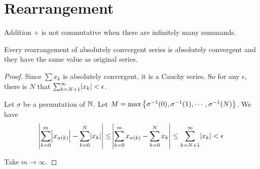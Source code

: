 
\section{Rearrangement}

Addition $+$ is not commutative when there are infinitely many summands.

\begin{theorem}
    Every rearrangement of absolutely convergent series is absolutely convergent and they have the same value as original series.    
\end{theorem}
\begin{proof}
    Since $\sum x_k$ is absolutely convergent, it is a Cauchy series. So for any $\epsilon$, there is $N$ that $\sum_{k=N+1}^\infty \abs{x_k} < \epsilon$.
    
    Let $\sigma$ be a permutation of $\mathbb{N}$. Let $M = \max \set{ {\sigma}^{-1} (0),  {\sigma}^{-1} (1), \cdots,  {\sigma}^{-1} (N) }$. We have
    \begin{equation}
        \abs{\sum_{k=0}^m \abs{x_{\sigma (k)}} - \sum_{k=0}^N \abs{x_k} } \leq \abs{\sum_{k=0}^m x_{\sigma (k)} - \sum_{k=0}^N x_k } \leq \sum_{k=N+1}^\infty \abs{x_k} < \epsilon
    \end{equation}
    
    Take $m \rightarrow \infty$.
\end{proof}

